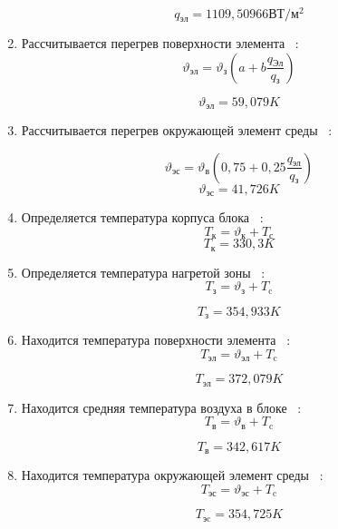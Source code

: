 \begin{enumerate}[label={\arabic*.}]
        $$q\mathrm{_{эл}} =1109,50966\mathrm{ВТ/м^2} $$

 \item Рассчитывается перегрев поверхности элемента ~\cite{Rotkop1976}:
 \begin{equation}
\vartheta\mathrm{_{эл}} = \vartheta\mathrm{_{з}} \left(a + b \frac{q\mathrm{_{Эл}}}{q\mathrm{_{з}}}\right)
\end{equation}

$$\vartheta\mathrm{_{эл}} =59,079K$$

\item Рассчитывается перегрев окружающей элемент среды ~\cite{Rotkop1976}:

      \begin{equation}
      \vartheta\mathrm{_{эс}} = \vartheta\mathrm{_в}(0,75 + 0,25\frac{q\mathrm{_{эл}}}{q\mathrm{_{з}}})
    \end{equation}
    $$\vartheta\mathrm{_{эс}} = 41,726K$$

  \item Определяется температура корпуса блока ~\cite{Rotkop1976}:
    \begin{equation}
      T\mathrm{_к} = \vartheta\mathrm{_{к}} + T\mathrm{_с}
    \end{equation}
    $$T\mathrm{_{к}} = 330,3 K$$
    
\item Определяется температура нагретой зоны ~\cite{Rotkop1976}:
    \begin{equation}
      T\mathrm{_з} = \vartheta\mathrm{_з} + T\mathrm{_c}
    \end{equation}

    $$T\mathrm{_з} = 354,933 K$$
  \item Находится температура поверхности элемента ~\cite{Rotkop1976}:
    \begin{equation}
      T\mathrm{_{эл}} = \vartheta\mathrm{_{эл}} + T\mathrm{_c}
    \end{equation}

    $$T\mathrm{_{эл}} = 372,079 K$$

  \item Находится средняя температура воздуха в блоке ~\cite{Rotkop1976}:
    \begin{equation}
      T\mathrm{_{в}} = \vartheta\mathrm{_{в}} + T\mathrm{_c}
    \end{equation}

    $$T\mathrm{_{в}} = 342,617 K$$

  \item Находится температура окружающей элемент среды ~\cite{Rotkop1976}:
    \begin{equation}
      T\mathrm{_{эс}} = \vartheta\mathrm{_{эс}} + T\mathrm{_c}
    \end{equation}

    $$T\mathrm{_{эc}} = 354,725 K$$
\end{enumerate}
 